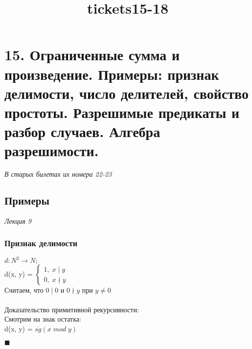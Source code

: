 \documentclass{article}
\title{tickets15-18}
\begin{document}
 

\section{15. Ограниченные сумма и произведение. Примеры: признак делимости, число делителей,
свойство простоты. Разрешимые предикаты и разбор случаев. Алгебра разрешимости.}

\emph{В старых билетах их номера 22-23}\\

\subsection{Примеры}
\emph{Лекция 9}
\subsubsection{Признак делимости} 
    $d: N^{2} \rightarrow N;$ \\
    d(x, y) =
    $\left\{ 
        \begin{aligned} 
        1,\; x \mid y \\
        0,\; x \nmid y
    \end{aligned}
    \right. $
    \\Считаем, что $0 \mid 0$ и $0 \nmid y$ при $y \neq 0$\\ 
    \\Доказательство примитивной рекурсивности:\\
    Смотрим на знак остатка:\\
    d(x, y) = $\overline{sg}(x\; mod\; y)$
    \begin{flushright}
        $\blacksquare$
    \end{flushright}
    
\end{document}

